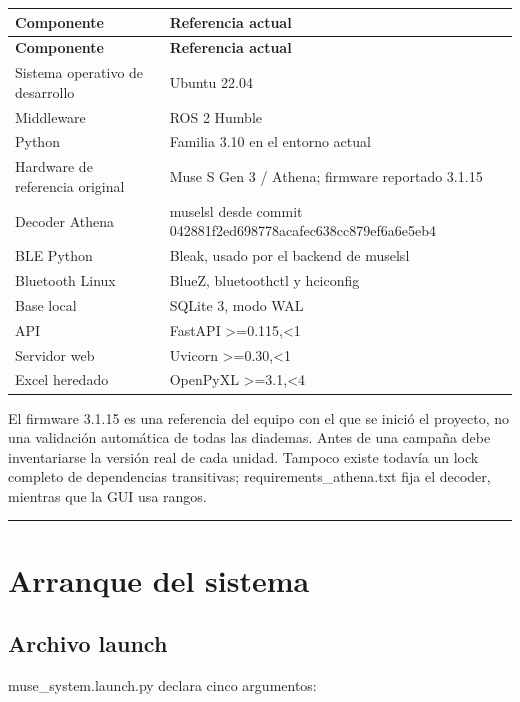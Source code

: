 \documentclass[11pt,a4paper]{article}
\begin{document}
\begin{longtable}{@{}>{\raggedright\arraybackslash}p{}>{\raggedright\arraybackslash}p{}@{}}
\toprule
\textbf{Componente} & \textbf{Referencia actual} \\
\midrule
\endfirsthead
\toprule
\textbf{Componente} & \textbf{Referencia actual} \\
\midrule
\endhead
Sistema operativo de desarrollo & Ubuntu 22.04 \\
Middleware & ROS 2 Humble \\
Python & Familia 3.10 en el entorno actual \\
Hardware de referencia original & Muse S Gen 3 / Athena; firmware reportado 3.1.15 \\
Decoder Athena & {\ttfamily\small muselsl} desde commit {\ttfamily\small 042881f2ed698778acafec638cc879ef6a6e5eb4} \\
BLE Python & Bleak, usado por el backend de {\ttfamily\small muselsl} \\
Bluetooth Linux & BlueZ, {\ttfamily\small bluetoothctl} y {\ttfamily\small hciconfig} \\
Base local & SQLite 3, modo WAL \\
API & FastAPI {\ttfamily\small >=0.115,<1} \\
Servidor web & Uvicorn {\ttfamily\small >=0.30,<1} \\
Excel heredado & OpenPyXL {\ttfamily\small >=3.1,<4} \\
\bottomrule
\end{longtable}

El firmware 3.1.15 es una referencia del equipo con el que se inició el proyecto, no una validación automática de todas las diademas. Antes de una campaña debe inventariarse la versión real de cada unidad. Tampoco existe todavía un lock completo de dependencias transitivas; {\ttfamily\small requirements\_athena.txt} fija el decoder, mientras que la GUI usa rangos.

\medskip\hrule\medskip

\section{Arranque del sistema}

\subsection{Archivo launch}

{\ttfamily\small muse\_system.launch.py} declara cinco argumentos:
\end{document}
